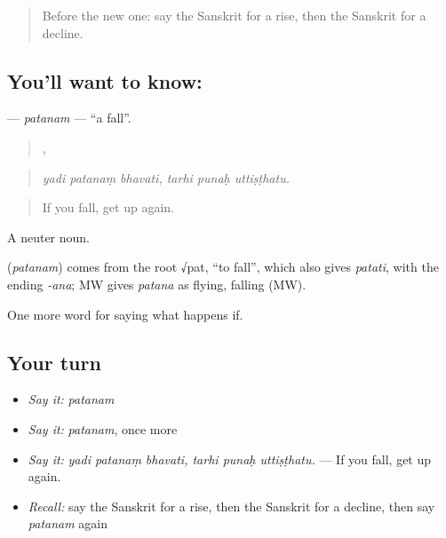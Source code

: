 \label{lesson:SA-C547-patanam}



\begin{quote}
Before the new one: say the Sanskrit for a rise, then the Sanskrit for a decline.
\end{quote}

\subsection*{You'll want to know: }
\textbf{} — \emph{patanam} — \textquotedblleft{}a fall\textquotedblright{}.

\begin{quote}
  ,   
\end{quote}

\begin{quote}
\emph{yadi patanaṃ bhavati, tarhi punaḥ uttiṣṭhatu.}
\end{quote}

\begin{quote}
If you fall, get up again.
\end{quote}

A neuter noun.

\begin{cousinweb}
\textbf{} (\emph{patanam}) comes from the root √pat, \textquotedblleft{}to fall\textquotedblright{}, which also gives \emph{patati}, with the ending \emph{-ana}; MW gives \emph{patana} as flying, falling (MW).
\end{cousinweb}

\begin{grammarlens}[title={What you've built}]
One more word for saying what happens if.
\end{grammarlens}

\subsection*{Your turn}
\begin{itemize}
\raggedright
  \item \emph{Say it:} \emph{patanam}
  \item \emph{Say it:} \emph{patanam}, once more
  \item \emph{Say it:} \emph{yadi patanaṃ bhavati, tarhi punaḥ uttiṣṭhatu.} — If you fall, get up again.
  \item \emph{Recall:} say the Sanskrit for a rise, then the Sanskrit for a decline, then say \emph{patanam} again
\end{itemize}

